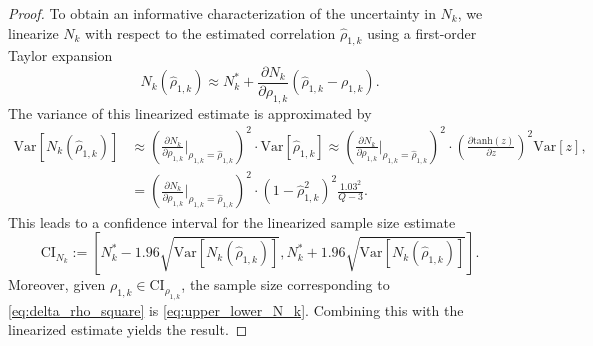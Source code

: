 \begin{proof}



To obtain an informative characterization of the uncertainty in $N_k$, we linearize $N_k$ with respect to the estimated correlation $\widehat\rho_{1,k}$ using a first-order Taylor expansion
%
\[
 N_k\left(\widehat\rho_{1,k}\right)\approx N_k^*+ \frac{\partial N_k}{\partial \rho_{1,k}} \left( \widehat\rho_{1,k}-\rho_{1,k}\right).
\]
%
The variance of this linearized estimate is approximated by
%
\begin{align*}
    \text{Var}\left[N_k\left(\widehat\rho_{1,k}\right)\right] &\approx \left(\frac{\partial N_k}{\partial \rho_{1,k}}\Bigg |_{\rho_{1,k} = \widehat\rho_{1,k}} \right)^2 \cdot \text{Var}\left[\widehat\rho_{1,k}\right] \approx \left(\frac{\partial N_k}{\partial \rho_{1,k}}\Bigg |_{\rho_{1,k} = \widehat\rho_{1,k}} \right)^2 \cdot \left(\frac{\partial \text{tanh}(z)}{\partial z}\right)^2\text{Var}[z],\\
    &= \left(\frac{\partial N_k}{\partial \rho_{1,k}}\Bigg |_{\rho_{1,k} = \widehat\rho_{1,k}} \right)^2 \cdot \left(1-\widehat\rho_{1,k}^2\right)^2\frac{1.03^2}{Q-3}.
\end{align*}
%
This leads to a confidence interval for the linearized sample size estimate
%
\[
\text{CI}_{N_k} :=\left[N_k^*-1.96\sqrt{\text{Var}\left[N_k\left(\widehat\rho_{1,k}\right)\right]}, N_k^*+1.96\sqrt{\text{Var}\left[N_k\left(\widehat\rho_{1,k}\right)\right]}\right].
\]
%
Moreover, given $\rho_{1,k}\in \text{CI}_{\rho_{1,k}}$,   the sample size corresponding to \eqref{eq:delta_rho_square} is \eqref{eq:upper_lower_N_k}. Combining this with the linearized estimate yields the result.
\end{proof}

